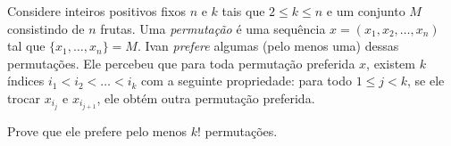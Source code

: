 Considere inteiros positivos fixos \(n\) e \(k\) tais que \(2 \le k \le n\) e um conjunto \(M\) consistindo de \(n\) frutas. Uma \emph{permutação} é uma sequência \(x = (x_1, x_2, \ldots, x_n)\) tal que \(\{x_1, \ldots, x_n\} = M\). Ivan \emph{prefere} algumas (pelo menos uma) dessas permutações. Ele percebeu que para toda permutação preferida \(x\), existem \(k\) índices \(i_1 < i_2 < \ldots < i_k\) com a seguinte propriedade: para todo \(1 \le j < k\), se ele trocar \(x_{i_j}\) e \(x_{i_{j+1}}\), ele obtém outra permutação preferida.

Prove que ele prefere pelo menos \(k!\) permutações.
